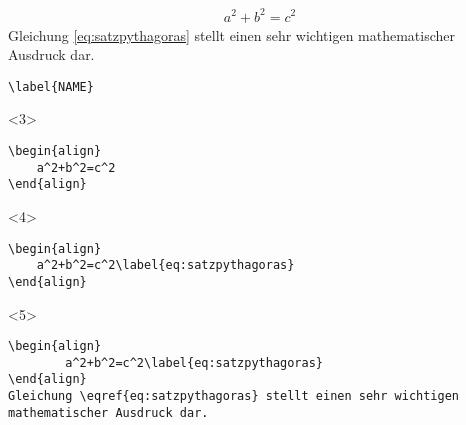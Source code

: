 \documentclass["WS\space 16-17\space -\space LaTeX-Kurs\space -\space Praesentation\space -\space 3.tex"]{subfiles}
\begin{document}
\begin{frame}[fragile]
	\Ausgabe
	\begin{outputbox}
		\begin{align}
			a^2+b^2=c^2\label{eq:satzpythagoras}
		\end{align}
		Gleichung \eqref{eq:satzpythagoras} stellt einen sehr wichtigen mathematischer Ausdruck dar.
	\end{outputbox}
	
	
	\pause
	\begin{lstlisting}
\label{NAME}
	\end{lstlisting}
	
	\pause
	\Code
	\begin{onlyenv}
		\begin{lstlisting}
\begin{align}
	a^2+b^2=c^2
\end{align}
		\end{lstlisting}
	\end{onlyenv}
	\begin{onlyenv}
		\begin{lstlisting}
\begin{align}
	a^2+b^2=c^2\label{eq:satzpythagoras}
\end{align}
		\end{lstlisting}
	\end{onlyenv}
	\begin{onlyenv}
		\begin{lstlisting}
\begin{align}
		a^2+b^2=c^2\label{eq:satzpythagoras}
\end{align}
Gleichung \eqref{eq:satzpythagoras} stellt einen sehr wichtigen mathematischer Ausdruck dar.
		\end{lstlisting}
	\end{onlyenv}
\end{frame}
\end{document}

